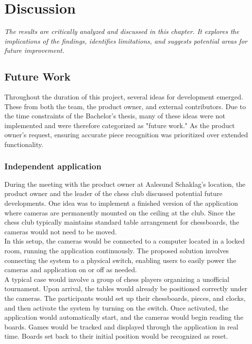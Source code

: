 \chapter{Discussion}

\begin{center}
    \textit{The results are critically analyzed and discussed in this chapter. It explores the implications of the findings, identifies limitations, and suggests potential areas for future improvement.}
\end{center}

\section{Future Work}
Throughout the duration of this project, several ideas for development emerged. These from both the team, the product owner, and external contributors. Due to the time constraints of the Bachelor’s thesis, many of these ideas were not implemented and were therefore categorized as "future work." As the product owner's request, ensuring accurate piece recognition was prioritized over extended functionality.

\subsection{Independent application}
During the meeting with the product owner at Aalesund Schaklag's location, the product owner and the leader of the chess club discussed potential future developments. One idea was to implement a finished version of the application where cameras are permanently mounted on the ceiling at the club. Since the chess club typically maintains standard table arrangement for chessboards, the cameras would not need to be moved. \\

In this setup, the cameras would be connected to a computer located in a locked room, running the application continuously. The proposed solution involves connecting the system to a physical switch, enabling users to easily power the cameras and application on or off as needed. \\

A typical case would involve a group of chess players organizing a unofficial tournament. Upon arrival, the tables would already be positioned correctly under the cameras. The participants would set up their chessboards, pieces, and clocks, and then activate the system by turning on the switch. Once activated, the application would automatically start, and the cameras would begin reading the boards. Games would be tracked and displayed through the application in real time. Boards set back to their initial position would be recognized as reset. \\

